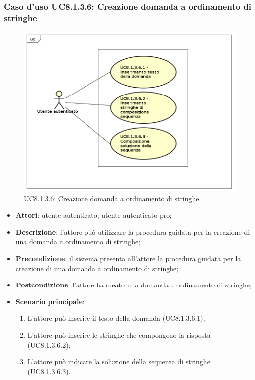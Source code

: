 \subsubsection{Caso d'uso UC8.1.3.6: Creazione domanda a ordinamento di stringhe}
	\label{UC8.1.3.6}
	\begin{figure}[h]
		\centering
			\includegraphics[scale=0.45,keepaspectratio]{UML/UC8_1_3_6.png}
		\caption{UC8.1.3.6: Creazione domanda a ordinamento di stringhe}
	\end{figure}
	\FloatBarrier
\begin{itemize}
	\item\textbf{Attori}: utente autenticato, utente autenticato pro;
	\item\textbf{Descrizione}: l'attore può utilizzare la procedura guidata per la creazione di una domanda a ordinamento di stringhe;
	\item \textbf{Precondizione}: il sistema presenta all'attore la procedura guidata per la creazione di una domanda a ordinamento di stringhe; 
	\item\textbf{Postcondizione}: l'attore ha creato una domanda a ordinamento di stringhe;
	\item\textbf{Scenario principale}:
		\begin{enumerate}
			\item L'attore può inserire il testo della domanda (UC8.1.3.6.1);
			\item L'attore può inserire le stringhe che compongono la risposta (UC8.1.3.6.2);
			\item L'attore può indicare la soluzione della sequenza di stringhe (UC8.1.3.6.3).
		\end{enumerate}
\end{itemize}

